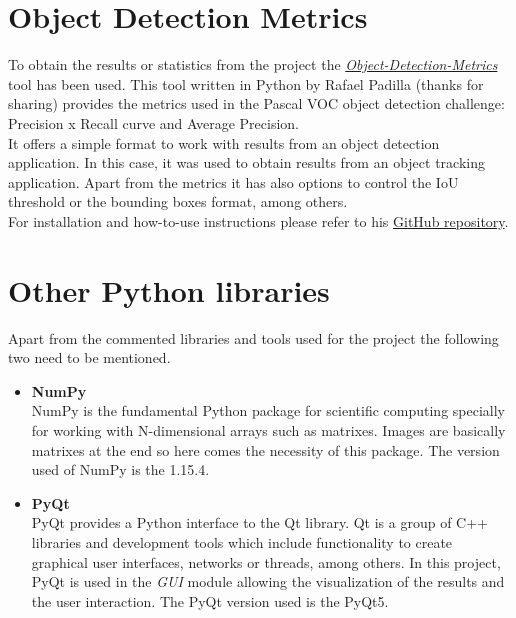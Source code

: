\section{Object Detection Metrics} \label{metrics_tool}
To obtain the results or statistics from the project the \href{https://github.com/rafaelpadilla/Object-Detection-Metrics}{\textit{Object-Detection-Metrics}} tool has been used. This tool written in Python by Rafael Padilla (thanks for sharing) provides the metrics used in the Pascal VOC object detection challenge: Precision x Recall curve and Average Precision.\\
It offers a simple format to work with results from an object detection application. In this case, it was used to obtain results from an object tracking application. Apart from the metrics it has also options to control the IoU threshold or the bounding boxes format, among others.\\
For installation and how-to-use instructions please refer to his \href{https://github.com/rafaelpadilla/Object-Detection-Metrics}{GitHub repository}.
\section{Other Python libraries}
Apart from the commented libraries and tools used for the project the following two need to be mentioned.
\begin{itemize}
\item \textbf{NumPy}\\
NumPy is the fundamental Python package for scientific computing specially for working with N-dimensional arrays such as matrixes. Images are basically matrixes at the end so here comes the necessity of this package. The version used of NumPy is the 1.15.4.
\item \textbf{PyQt}\\
PyQt provides a Python interface to the Qt library. Qt is a group of C++ libraries and development tools which include functionality to create graphical user interfaces, networks or threads, among others. In this project, PyQt is used in the \textit{GUI} module allowing the visualization of the results and the user interaction. The PyQt version used is the PyQt5.
\end{itemize}
